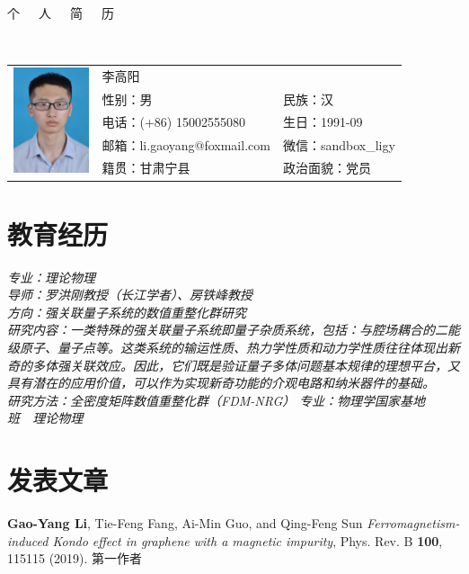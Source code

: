 \documentclass{resume}
\begin{document}

\begin{center}
\Huge{个~~~人~~~简~~~历}
\end{center}
\\
\Large{
  \begin{tabu}{ c l l }
    &
   \scshape{李高阳} &  \\
    & 性别：男 & 民族：汉 \\
    & 电话：(+86) 15002555080 & 生日：1991-09 \\
    & 邮箱：li.gaoyang@foxmail.com & 微信：sandbox\_ligy\\
    & 籍贯：甘肃宁县 & 政治面貌：党员
  \end{tabu}
}

\section{教育经历}
\textit{专业：理论物理}\\
\textit{导师：罗洪刚教授（长江学者）、房铁峰教授}\\
\textit{方向：强关联量子系统的数值重整化群研究}\\
\textit{研究内容：一类特殊的强关联量子系统即量子杂质系统，包括：与腔场耦合的二能级原子、量子点等。这类系统的输运性质、热力学性质和动力学性质往往体现出新奇的多体强关联效应。因此，它们既是验证量子多体问题基本规律的理想平台，又具有潜在的应用价值，可以作为实现新奇功能的介观电路和纳米器件的基础。}\\
\textit{研究方法：全密度矩阵数值重整化群（FDM-NRG）}
\textit{专业：物理学国家基地班\ \ 理论物理}

\section{发表文章}
\textbf{Gao-Yang Li}, Tie-Feng Fang, Ai-Min Guo, and Qing-Feng Sun \textit{Ferromagnetism-induced Kondo effect in graphene with a magnetic impurity}, Phys. Rev. B \textbf{100}, 115115 (2019). 第一作者
\end{document}
